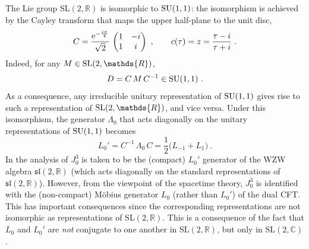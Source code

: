 \documentclass[12pt,a4paper]{article}
\newcommand{\be}{\begin{equation}}
\newcommand{\ee}{\end{equation}}
\begin{document}
The Lie group $\mathrm{SL}(2,\mathds{R})$ is isomorphic to ${\rm SU}(1,1)$: the isomorphism is 
achieved by the Cayley transform that maps the upper half-plane to the unit disc, 
\be
C = \frac{\mathrm{e}^{-\frac{i\pi}{4}}}{\sqrt{2}}\, \begin{pmatrix} 1 & -i \cr 1 & i \end{pmatrix} \ , \qquad c(\tau) = z = \frac{\tau-i}{\tau+i} \ .
\ee
Indeed, for any $M \in {\rm SL}(2,\mathds{R})$, 
\be
D = C \, M \, C^{-1} \in {\rm SU}(1,1) \ . 
\ee
As a consequence, any irreducible unitary representation of ${\rm SU}(1,1)$ gives rise to such a representation of ${\rm SL}(2,\mathds{R})$, and vice versa. Under this isomorphism, the generator $\Lambda_0$ that acts diagonally on the unitary representations of ${\rm SU}(1,1)$ becomes 
\be
L_0' = C^{-1} \, \Lambda_0 \,  C = \frac{1}{2} \bigl( L_{-1} + L_{1} \bigr) \ . 
\ee
In the analysis of \cite{Maldacena:2000hw} $J^3_0$ is taken to be the (compact) $L_0'$ generator of the WZW algebra $\mathfrak{sl}(2,\mathds{R})$ (which acts diagonally on the standard representations of $\mathfrak{sl}(2,\mathds{R})$). However, from the viewpoint of the spacetime theory, $J^3_0$ is identified with the (non-compact) M\"obius generator $L_0$ (rather than $L_0'$) of the dual CFT. This has important consequences since the corresponding representations are not isomorphic as representations of $\mathrm{SL}(2,\mathds{R})$. This is a consequence of the fact that $L_0$ and $L_0'$ are {\it not} conjugate to one another in $\mathrm{SL}(2,\mathds{R})$, but only in $\mathrm{SL}(2,\mathds{C})$. 
\end{document}
